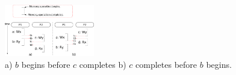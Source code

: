 \begin{figure}[t]
  \centering
  \includegraphics[width=0.35\textwidth]{1_figures/hb-bbc-hb.pdf}
  \caption{a) $b$ begins before $c$ completes  b) $c$ completes before $b$ begins. }
  \vspace{-1em}
  \label{fig:bbc}
\end{figure}